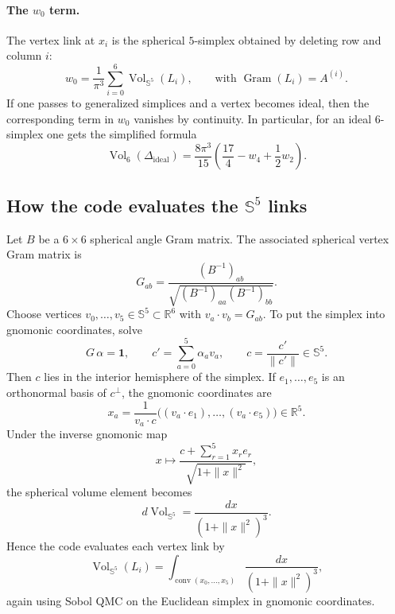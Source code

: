 \documentclass[11pt]{article}
\newcommand{\Ss}{\mathbb{S}}
\newcommand{\Rr}{\mathbb{R}}
\newcommand{\Vol}{\operatorname{Vol}}
\newcommand{\conv}{\operatorname{conv}}
\begin{document}
\paragraph{The $w_0$ term.}
The vertex link at $x_i$ is the spherical $5$-simplex obtained by deleting row and column $i$:
\begin{equation}
\label{eq:w0}
 w_0=\frac{1}{\pi^3}\sum_{i=0}^{6}\Vol_{\Ss^5}(L_i),
 \qquad
 \text{with }\operatorname{Gram}(L_i)=A^{(i)}.
\end{equation}
If one passes to generalized simplices and a vertex becomes ideal, then the corresponding term in
$w_0$ vanishes by continuity.  In particular, for an ideal $6$-simplex one gets the simplified
formula
\begin{equation}
\label{eq:h6-ideal}
\Vol_6(\Delta_{\mathrm{ideal}})
=
\frac{8\pi^3}{15}
\left(
\frac{17}{4}-w_4+\frac12 w_2
\right).
\end{equation}

\subsection*{How the code evaluates the $\Ss^5$ links}

Let $B$ be a $6\times 6$ spherical angle Gram matrix.  The associated spherical vertex Gram matrix is
\begin{equation}
\label{eq:spherical-vertex-gram}
 G_{ab}=\frac{(B^{-1})_{ab}}{\sqrt{(B^{-1})_{aa}(B^{-1})_{bb}}}.
\end{equation}
Choose vertices $v_0,\dots,v_5\in \Ss^5\subset \Rr^6$ with $v_a\cdot v_b=G_{ab}$.
To put the simplex into gnomonic coordinates, solve
\[
G\,\alpha=\mathbf 1,
\qquad
c'=\sum_{a=0}^{5}\alpha_a v_a,
\qquad
c=\frac{c'}{\|c'\|}\in \Ss^5.
\]
Then $c$ lies in the interior hemisphere of the simplex.  If $e_1,\dots,e_5$ is an orthonormal
basis of $c^{\perp}$, the gnomonic coordinates are
\begin{equation}
\label{eq:gnomonic-coords}
 x_a=
 \frac{1}{v_a\cdot c}
 \bigl((v_a\cdot e_1),\dots,(v_a\cdot e_5)\bigr)
 \in \Rr^5.
\end{equation}
Under the inverse gnomonic map
\[
 x\longmapsto \frac{c+\sum_{r=1}^{5}x_r e_r}{\sqrt{1+\|x\|^2}},
\]
the spherical volume element becomes
\begin{equation}
\label{eq:spherical-gnomonic-density}
 d\Vol_{\Ss^5}=
 \frac{dx}{(1+\|x\|^2)^3}.
\end{equation}
Hence the code evaluates each vertex link by
\begin{equation}
\label{eq:s5-qmc}
\Vol_{\Ss^5}(L_i)
=
\int_{\conv(x_0,\dots,x_5)}\frac{dx}{(1+\|x\|^2)^3},
\end{equation}
again using Sobol QMC on the Euclidean simplex in gnomonic coordinates.
\end{document}
